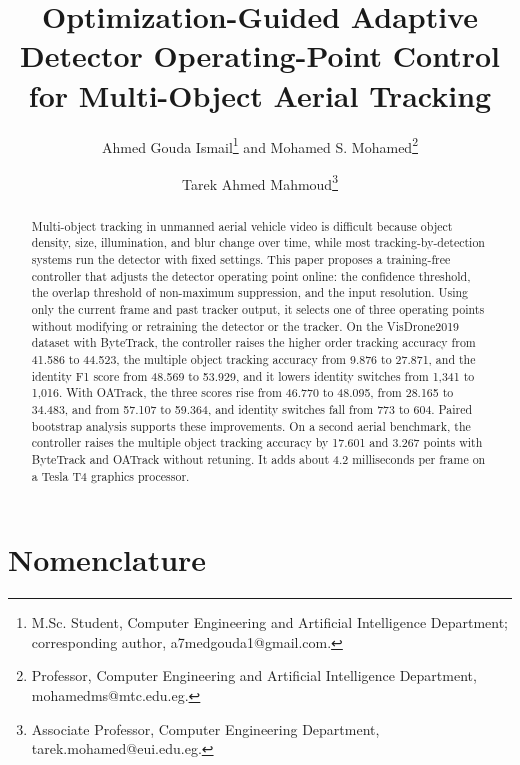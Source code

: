 \documentclass[journal]{new-aiaa}
\title{Optimization-Guided Adaptive Detector Operating-Point Control for Multi-Object Aerial Tracking}
\author{Ahmed Gouda Ismail\footnote{M.Sc. Student, Computer Engineering and Artificial Intelligence Department; corresponding author, a7medgouda1@gmail.com.} and Mohamed S. Mohamed\footnote{Professor, Computer Engineering and Artificial Intelligence Department, mohamedms@mtc.edu.eg.}}
\affil{Military Technical College, Cairo, Egypt}
\author{Tarek Ahmed Mahmoud\footnote{Associate Professor, Computer Engineering Department, tarek.mohamed@eui.edu.eg.}}
\affil{Egypt University of Informatics, Cairo, Egypt}
\begin{document}
\maketitle

\begin{abstract}
Multi-object tracking in unmanned aerial vehicle video is difficult because object density, size, illumination, and blur change over time, while most tracking-by-detection systems run the detector with fixed settings. This paper proposes a training-free controller that adjusts the detector operating point online: the confidence threshold, the overlap threshold of non-maximum suppression, and the input resolution. Using only the current frame and past tracker output, it selects one of three operating points without modifying or retraining the detector or the tracker. On the VisDrone2019 dataset with ByteTrack, the controller raises the higher order tracking accuracy from 41.586 to 44.523, the multiple object tracking accuracy from 9.876 to 27.871, and the identity F1 score from 48.569 to 53.929, and it lowers identity switches from 1,341 to 1,016. With OATrack, the three scores rise from 46.770 to 48.095, from 28.165 to 34.483, and from 57.107 to 59.364, and identity switches fall from 773 to 604. Paired bootstrap analysis supports these improvements. On a second aerial benchmark, the controller raises the multiple object tracking accuracy by 17.601 and 3.267 points with ByteTrack and OATrack without retuning. It adds about 4.2 milliseconds per frame on a Tesla T4 graphics processor.
\end{abstract}

\section*{Nomenclature}
\end{document}
